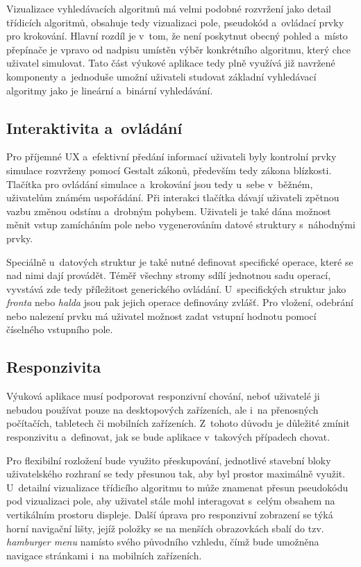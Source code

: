 Vizualizace vyhledávacích algoritmů má velmi podobné rozvržení jako detail třídicích algoritmů, obsahuje tedy vizualizaci pole, pseudokód a~ovládací prvky pro krokování.
Hlavní rozdíl je v~tom, že není poskytnut obecný pohled a~místo přepínače je vpravo od nadpisu umístěn výběr konkrétního algoritmu, který chce uživatel simulovat.
Tato část výukové aplikace tedy plně využívá již navržené komponenty a~jednoduše umožní uživateli studovat základní vyhledávací algoritmy jako je lineární a~binární vyhledávání.

\subsection{Interaktivita a~ovládání}
\label{subsec:interactivity-controls}

Pro příjemné UX a~efektivní předání informací uživateli byly kontrolní prvky simulace rozvrženy pomocí Gestalt zákonů, především tedy zákona blízkosti.
Tlačítka pro ovládání simulace a~krokování jsou tedy u~sebe v~běžném, uživatelům známém uspořádání.
Při interakci tlačítka dávají uživateli zpětnou vazbu změnou odstínu a~drobným pohybem.
Uživateli je také dána možnost měnit vstup zamícháním pole nebo vygenerováním datové struktury s~náhodnými prvky.

Speciálně u~datových struktur je také nutné definovat specifické operace, které se nad nimi dají provádět.
Téměř všechny stromy sdílí jednotnou sadu operací, vyvstává zde tedy příležitost generického ovládání.
U~specifických struktur jako \textit{fronta} nebo \textit{halda} jsou pak jejich operace definovány zvlášť.
Pro vložení, odebrání nebo nalezení prvku má uživatel možnost zadat vstupní hodnotu pomocí číselného vstupního pole.

\subsection{Responzivita}
\label{subsec:responsivity}

Výuková aplikace musí podporovat responzivní chování, neboť uživatelé ji nebudou používat pouze na desktopových zařízeních, ale i~na přenosných počítačích, tabletech či mobilních zařízeních.
Z~tohoto důvodu je důležité zmínit responzivitu a~definovat, jak se bude aplikace v~takových případech chovat.

Pro flexibilní rozložení bude využito přeskupování, jednotlivé stavební bloky uživatelského rozhraní se tedy přesunou tak, aby byl prostor maximálně využit.
U~detailní vizualizace třídicího algoritmu to může znamenat přesun pseudokódu pod vizualizaci pole, aby uživatel stále mohl interagovat s~celým obsahem na vertikálním prostoru displeje.
Další úprava pro responzivní zobrazení se týká horní navigační lišty, jejíž položky se na menších obrazovkách sbalí do tzv. \textit{hamburger menu} namísto svého původního vzhledu, čímž bude umožněna navigace stránkami i~na mobilních zařízeních.

